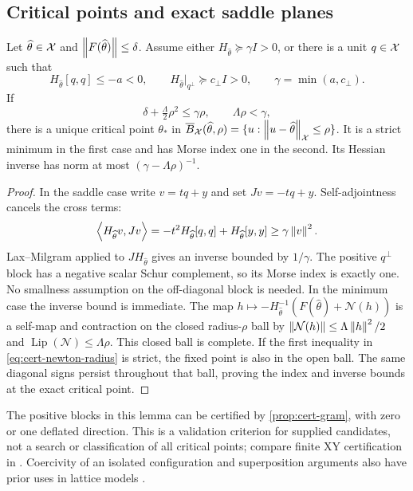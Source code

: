\subsection{Critical points and exact saddle planes}

\begin{lemma}\label{lem:cert-newton}
Let $\widehat\theta\in\mathcal X$ and $\left\lVert F(\widehat\theta)\right\rVert\le\delta$.
Assume either $H_{\widehat\theta}\succeq\gamma I>0$, or there is a unit
$q\in\mathcal X$ such that
\begin{equation}\label{eq:cert-saddle-splitting}
 H_{\widehat\theta}[q,q]\le-a<0,\qquad
 H_{\widehat\theta}|_{q^\perp}\succeq c_{\perp}I>0,
 \qquad \gamma=\min(a,c_{\perp}).
\end{equation}
If
\begin{equation}\label{eq:cert-newton-radius}
 \delta+\tfrac\Lambda2\rho^2\le\gamma\rho,
 \qquad \Lambda\rho<\gamma,
\end{equation}
there is a unique critical point $\theta_*$ in
$\overline B_\mathcal X(\widehat\theta,\rho)
 =\{u:\left\lVert u-\widehat\theta\right\rVert_\mathcal X\le\rho\}$. It is a strict minimum in the
first case and has Morse index one in the second. Its Hessian inverse
has norm at most $(\gamma-\Lambda\rho)^{-1}$.
\end{lemma}
\begin{proof}
In the saddle case write $v=tq+y$ and set $Jv=-tq+y$. Self-adjointness
cancels the cross terms:
\[
 \left\langle H_{\widehat\theta}v,Jv\right\rangle
 =-t^2H_{\widehat\theta}[q,q]+H_{\widehat\theta}[y,y]
 \ge\gamma\left\lVert v\right\rVert^2.
\]
Lax--Milgram applied to $JH_{\widehat\theta}$ gives an inverse bounded
by $1/\gamma$. The positive $q^\perp$ block has a negative scalar
Schur complement, so its Morse index is exactly one. No smallness
assumption on the off-diagonal block is needed. In the minimum case
the inverse bound is immediate. The map
$h\mapsto-H_{\widehat\theta}^{-1}(F(\widehat\theta)+\mathcal N(h))$
is a self-map and contraction on the closed radius-$\rho$ ball by
$\left\lVert\mathcal N(h)\right\rVert\le\Lambda\left\lVert h\right\rVert^2/2$ and
$\operatorname{Lip}(\mathcal N)\le\Lambda\rho$.
This closed ball is complete. If the first inequality in
\eqref{eq:cert-newton-radius} is strict, the fixed point is also in the
open ball.
The same diagonal signs persist throughout that ball, proving the
index and inverse bounds at the exact critical point.
\end{proof}

The positive blocks in this lemma can be certified by
\cref{prop:cert-gram}, with zero or one deflated direction. This is a
validation criterion for supplied candidates, not a search or
classification of all critical points; compare finite XY certification
in \cite{Mehta2014}. Coercivity of an isolated configuration and
superposition arguments also have prior uses in lattice models
\cite{Hudson2015}.


